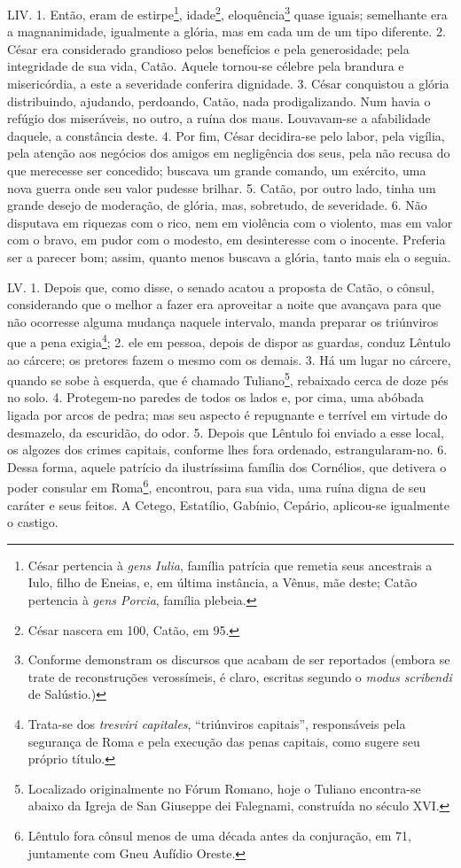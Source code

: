 LIV. 1. Então, eram de estirpe\footnote{César pertencia à \emph{gens Iulia},
família patrícia que remetia seus ancestrais a Iulo, filho de Eneias, e, em
última instância, a Vênus, mãe deste; Catão pertencia à \emph{gens Porcia},
família plebeia.}, idade\footnote{César nascera em 100, Catão, em 95.},
eloquência\footnote{Conforme demonstram os discursos que acabam de ser
reportados (embora se trate de reconstruções verossímeis, é claro, escritas
segundo o \emph{modus scribendi} de Salústio.)} quase iguais; semelhante era a
magnanimidade, igualmente a glória, mas em cada um de um tipo diferente. 2.
César era considerado grandioso pelos benefícios e pela generosidade; pela
integridade de sua vida, Catão. Aquele tornou-se célebre pela brandura e
misericórdia, a este a severidade conferira dignidade. 3. César conquistou a
glória distribuindo, ajudando, perdoando, Catão, nada prodigalizando. Num havia
o refúgio dos miseráveis, no outro, a ruína dos maus. Louvavam-se a afabilidade
daquele, a constância deste. 4. Por fim, César decidira-se pelo labor, pela
vigília, pela atenção aos negócios dos amigos em negligência dos seus, pela não
recusa do que merecesse ser concedido; buscava um grande comando, um exército,
uma nova guerra onde seu valor pudesse brilhar. 5. Catão, por outro lado, tinha
um grande desejo de moderação, de glória, mas, sobretudo, de severidade. 6. Não
disputava em riquezas com o rico, nem em violência com o violento, mas em valor
com o bravo, em pudor com o modesto, em desinteresse com o inocente. Preferia
ser a parecer bom; assim, quanto menos buscava a glória, tanto mais ela o
seguia. 

LV. 1. Depois que, como disse, o senado acatou a proposta de Catão, o cônsul,
considerando que o melhor a fazer era aproveitar a noite que avançava para que
não ocorresse alguma mudança naquele intervalo, manda preparar os triúnviros
que a pena exigia\footnote{Trata-se dos \emph{tresviri capitales}, ``triúnviros
capitais'', responsáveis pela segurança de Roma e pela execução das penas
capitais, como sugere seu próprio título.}; 2. ele em pessoa, depois de dispor
as guardas, conduz Lêntulo ao cárcere; os pretores fazem o mesmo com os demais.
3. Há um lugar no cárcere, quando se sobe à esquerda, que é chamado
Tuliano\footnote{Localizado originalmente no Fórum Romano, hoje o Tuliano
encontra-se abaixo da Igreja de San Giuseppe dei Falegnami, construída no
século XVI.}, rebaixado cerca de doze pés no solo. 4. Protegem-no paredes de
todos os lados e, por cima, uma abóbada ligada por arcos de pedra; mas seu
aspecto é repugnante e terrível em virtude do desmazelo, da escuridão, do odor.
5. Depois que Lêntulo foi enviado a esse local, os algozes dos crimes capitais,
conforme lhes fora ordenado, estrangularam-no. 6. Dessa forma, aquele patrício
da ilustríssima família dos Cornélios, que detivera o poder consular em
Roma\footnote{Lêntulo fora cônsul menos de uma década antes da conjuração, em
71, juntamente com Gneu Aufídio Oreste.}, encontrou, para sua vida, uma ruína
digna de seu caráter e seus feitos. A Cetego, Estatílio, Gabínio, Cepário,
aplicou-se igualmente o castigo.

